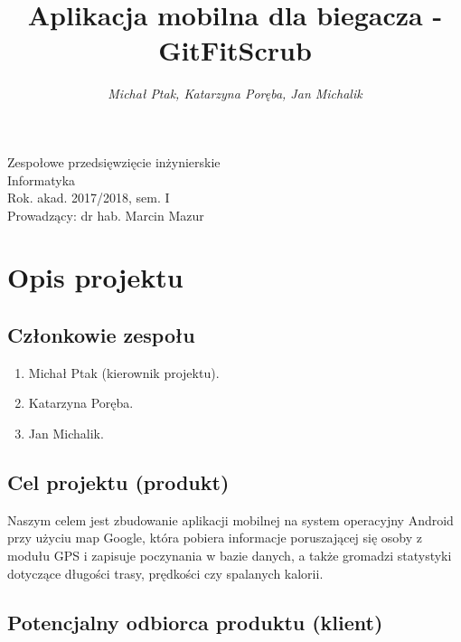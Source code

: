\documentclass[a4paper]{article}
\title{\bf{Aplikacja mobilna dla biegacza - GitFitScrub}}
\author{{\em Michał Ptak, Katarzyna Poręba, Jan Michalik}}
\date{}
\begin{document}
\begin{titlepage}
\maketitle
\thispagestyle{empty}
\bigskip
\begin{center}
Zespołowe przedsięwzięcie inżynierskie\\[2mm]

Informatyka\\[2mm]

Rok. akad. 2017/2018, sem. I\\[2mm]

Prowadzący: dr hab. Marcin Mazur
\end{center}
\end{titlepage}

\tableofcontents
\thispagestyle{empty}

\newpage

\section{Opis projektu}

\subsection{Członkowie zespołu}

\begin{enumerate}
\item Michał Ptak (kierownik projektu).
\item Katarzyna Poręba.
\item Jan Michalik.
\end{enumerate}

\subsection{Cel projektu (produkt)}

Naszym celem jest zbudowanie aplikacji mobilnej na system operacyjny Android przy użyciu map Google, która pobiera informacje poruszającej się osoby z modułu GPS i zapisuje poczynania w bazie danych, a także gromadzi statystyki dotyczące długości trasy, prędkości czy spalanych kalorii.

\subsection{Potencjalny odbiorca produktu (klient)}
\end{document}
